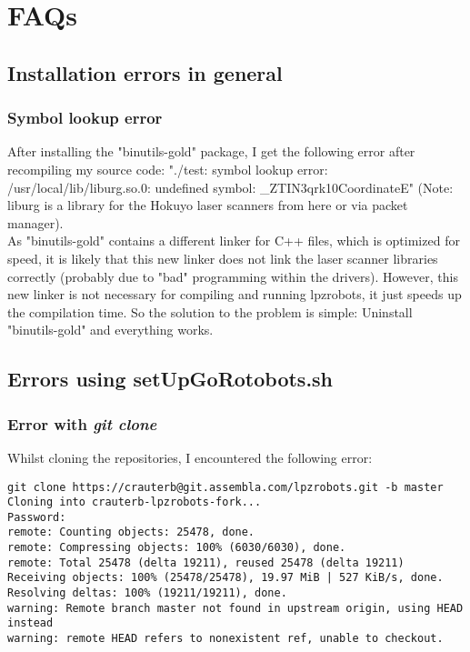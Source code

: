 \section{FAQs}

\subsection{Installation errors in general}

\subsubsection{Symbol lookup error}
After installing the "binutils-gold" package, I get the following error after recompiling my source code:
"./test: symbol lookup error: /usr/local/lib/liburg.so.0: undefined symbol: \_ZTIN3qrk10CoordinateE"
(Note: liburg is a library for the Hokuyo laser scanners from here or via packet manager).\\

As "binutils-gold" contains a different linker for C++ files, which is optimized for speed, it is likely that this new linker does not link the laser scanner libraries correctly (probably due to "bad" programming within the drivers).
However, this new linker is not necessary for compiling and running lpzrobots, it just speeds up the compilation time.
So the solution to the problem is simple: Uninstall "binutils-gold" and everything works.


\subsection{Errors using setUpGoRotobots.sh}

\subsubsection{Error with \emph{git clone}}

Whilst cloning the repositories, I encountered the following error:
\begin{lstlisting}
git clone https://crauterb@git.assembla.com/lpzrobots.git -b master
Cloning into crauterb-lpzrobots-fork...
Password:
remote: Counting objects: 25478, done.
remote: Compressing objects: 100% (6030/6030), done.
remote: Total 25478 (delta 19211), reused 25478 (delta 19211)
Receiving objects: 100% (25478/25478), 19.97 MiB | 527 KiB/s, done.
Resolving deltas: 100% (19211/19211), done.
warning: Remote branch master not found in upstream origin, using HEAD instead
warning: remote HEAD refers to nonexistent ref, unable to checkout.
\end{lstlisting}

